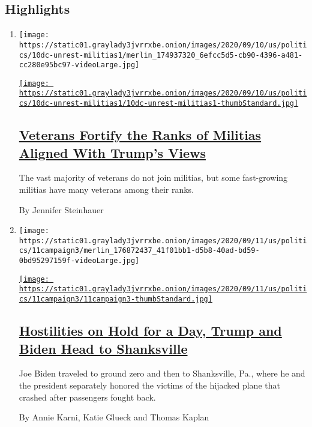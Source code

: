 \hypertarget{highlights}{%
\subsection{Highlights}\label{highlights}}

\begin{enumerate}
\def\labelenumi{\arabic{enumi}.}
\item
  \texttt{[image: https://static01.graylady3jvrrxbe.onion/images/2020/09/10/us/politics/10dc-unrest-militias1/merlin\_174937320\_6efcc5d5-cb90-4396-a481-cc280e95bc97-videoLarge.jpg]}

  \href{/2020/09/11/us/politics/veterans-trump-protests-militias.html}{\texttt{[image: https://static01.graylady3jvrrxbe.onion/images/2020/09/10/us/politics/10dc-unrest-militias1/10dc-unrest-militias1-thumbStandard.jpg]}}

  \hypertarget{veterans-fortify-the-ranks-of-militias-aligned-with-trumps-views}{%
  \subsection{\texorpdfstring{\href{/2020/09/11/us/politics/veterans-trump-protests-militias.html}{Veterans
  Fortify the Ranks of Militias Aligned With Trump's
  Views}}{Veterans Fortify the Ranks of Militias Aligned With Trump's Views}}\label{veterans-fortify-the-ranks-of-militias-aligned-with-trumps-views}}

  The vast majority of veterans do not join militias, but some
  fast-growing militias have many veterans among their ranks.

  By Jennifer Steinhauer
\item
  \texttt{[image: https://static01.graylady3jvrrxbe.onion/images/2020/09/11/us/politics/11campaign3/merlin\_176872437\_41f01bb1-d5b8-40ad-bd59-0bd95297159f-videoLarge.jpg]}

  \href{/2020/09/11/us/politics/shanksville-trump-biden.html}{\texttt{[image: https://static01.graylady3jvrrxbe.onion/images/2020/09/11/us/politics/11campaign3/11campaign3-thumbStandard.jpg]}}

  \hypertarget{hostilities-on-hold-for-a-day-trump-and-biden-head-to-shanksville}{%
  \subsection{\texorpdfstring{\href{/2020/09/11/us/politics/shanksville-trump-biden.html}{Hostilities
  on Hold for a Day, Trump and Biden Head to
  Shanksville}}{Hostilities on Hold for a Day, Trump and Biden Head to Shanksville}}\label{hostilities-on-hold-for-a-day-trump-and-biden-head-to-shanksville}}

  Joe Biden traveled to ground zero and then to Shanksville, Pa., where
  he and the president separately honored the victims of the hijacked
  plane that crashed after passengers fought back.

  By Annie Karni, Katie Glueck and Thomas Kaplan
\end{enumerate}

